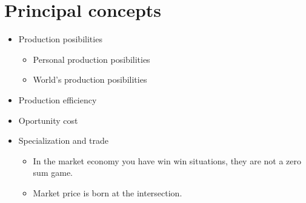 \section{Principal concepts}
\begin{itemize}
    \item Production posibilities 
        \begin{itemize}
            \item Personal production posibilities
            \item World's production posibilities 
        \end{itemize}
    \item Production efficiency 
    \item Oportunity cost 
    \item Specialization and trade
        \begin{itemize}
            \item In the market economy you have win win situations, they are not a zero sum game. 
            \item Market price is born at the intersection.
        \end{itemize}
\end{itemize}
